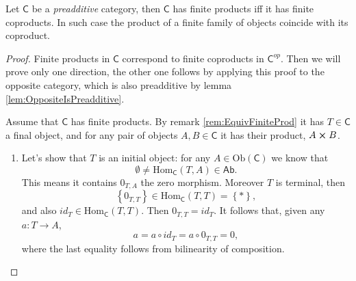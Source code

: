 \documentclass[../Main]{subfiles}
\begin{document}
\begin{lem}\label{lem:CoProdPreadditive}
	Let $\mathsf{C}$ be a {\em preadditive} category, then
	$\mathsf{C}$ has finite products iff it has finite coproducts.
	In such case the product of a finite family of objects coincide
	with its coproduct.
\end{lem} 

\begin{proof}
	Finite products in $\mathsf{C}$ correspond to finite coproducts in $\mathsf{C}^{op}$.
	Then we will prove only one direction, the other one follows by applying this proof
	to the opposite category, which is also preadditive by lemma \ref{lem:OppositeIsPreadditive}.

	Assume that $\mathsf{C}$ has finite products.
	By remark \ref{rem:EquivFiniteProd} it has
	$T \in \mathsf{C}$ a final object, and for any pair of objects $A,B \in \mathsf{C}$
	it has their product, $A \cross B$.
	\begin{enumerate}
		\item Let's show that $T$ is an initial object:
			for any $A \in \mathrm{Ob} \left(\mathsf{C}\right)$ we know that
			\begin{equation}
			\emptyset \neq \mathrm{Hom}_{\mathsf{C}} \left( T, A \right) \in \mathsf{Ab}
			.\end{equation} 
			This means it contains $0_{T,A}$ the zero morphism.
			Moreover $T$ is terminal, then
			\begin{equation}
			\left\{ 0_{T,T} \right\} \in \mathrm{Hom}_{\mathsf{C}} \left( T, T \right)
			= \left\{ * \right\}
			,\end{equation} 
			and also $id_T \in \mathrm{Hom}_{\mathsf{C}} \left( T, T \right)$.
			Then $0_{T,T} = id_T$.
			It follows that, given any $a\colon T \to A$,
			\begin{equation}
			a = a \circ id_T = a \circ 0_{T,T} = 0
			,\end{equation} 
			where the last equality follows from bilinearity of composition.


\end{enumerate}
\end{proof}
\end{document}
